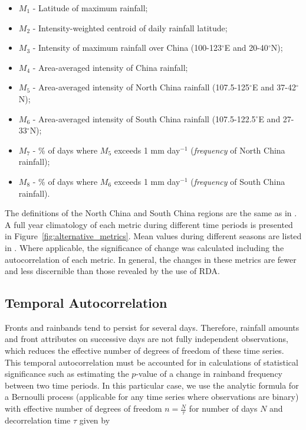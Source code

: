 \documentclass[9pt,twocolumn,twoside,lineno]{pnas-new}
\begin{document}
\begin{itemize}

	\item $M_1$ - Latitude of maximum rainfall;
	
	\item $M_2$ - Intensity-weighted centroid of daily rainfall latitude;
	
	\item $M_3$ - Intensity of maximum rainfall over China (100-123$^{\circ}$E and 20-40$^{\circ}$N);
	
	\item $M_4$ - Area-averaged intensity of China rainfall; 
	
	\item $M_5$ - Area-averaged intensity of North China rainfall (107.5-125$^{\circ}$E and 37-42$^{\circ}$N); 
	
	\item $M_6$ - Area-averaged intensity of South China rainfall (107.5-122.5$^{\circ}$E and 27-33$^{\circ}$N); 
	
	\item $M_7$ - \% of days where $M_5$ exceeds 1 mm day$^{-1}$ (\textit{frequency} of North China rainfall);
	
	\item $M_8$ - \% of days where $M_6$ exceeds 1 mm day$^{-1}$ (\textit{frequency} of South China rainfall).
	
\end{itemize}

 The definitions of the North China and South China regions are the same as in \citet{Yu2010}. A full year climatology of each metric during different time periods is presented in Figure~\ref{fig:alternative_metrics}. Mean values during different seasons are listed in \citet{Day2016}. Where applicable, the significance of change was calculated including the autocorrelation of each metric. In general, the changes in these metrics are fewer and less discernible than those revealed by the use of RDA.
 
 \subsection{Temporal Autocorrelation}

	Fronts and rainbands tend to persist for several days. Therefore, rainfall amounts and front attributes on successive days are not fully independent observations, which reduces the effective number of degrees of freedom of these time series. This temporal autocorrelation must be accounted for in calculations of statistical significance such as estimating the $p$-value of a change in rainband frequency between two time periods. In this particular case, we use the analytic formula for a Bernoulli process (applicable for any time series where observations are binary) with effective number of degrees of freedom $n=\frac{N}{\tau}$ for number of days $N$ and decorrelation time $\tau$ given by
\end{document}
